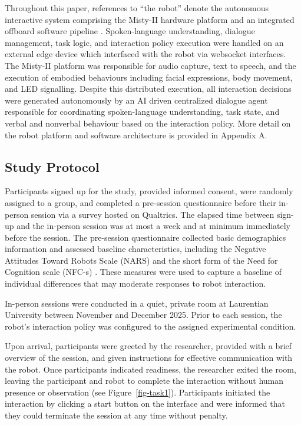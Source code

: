 \documentclass[
]{article}
\begin{document}
Throughout this paper, references to ``the robot'' denote the autonomous
interactive system comprising the Misty-II hardware platform and an
integrated offboard software pipeline \autocite{mistyrobotics}.
Spoken-language understanding, dialogue management, task logic, and
interaction policy execution were handled on an external edge device
which interfaced with the robot via websocket interfaces. The Misty-II
platform was responsible for audio capture, text to speech, and the
execution of embodied behaviours including facial expressions, body
movement, and LED signalling. Despite this distributed execution, all
interaction decisions were generated autonomously by an AI driven
centralized dialogue agent responsible for coordinating spoken-language
understanding, task state, and verbal and nonverbal behaviour based on
the interaction policy. More detail on the robot platform and software
architecture is provided in Appendix A.

\subsection{Study Protocol}\label{study-protocol}

Participants signed up for the study, provided informed consent, were
randomly assigned to a group, and completed a pre-session questionnaire
before their in-person session via a survey hosted on Qualtrics. The
elapsed time between sign-up and the in-person session was at most a
week and at minimum immediately before the session. The pre-session
questionnaire collected basic demographics information and assessed
baseline characteristics, including the Negative Attitudes Toward Robots
Scale (NARS) and the short form of the Need for Cognition scale (NFC-s)
\autocite{nomura,cacioppo1982}. These measures were used to capture a
baseline of individual differences that may moderate responses to robot
interaction.

In-person sessions were conducted in a quiet, private room at Laurentian
University between November and December 2025. Prior to each session,
the robot's interaction policy was configured to the assigned
experimental condition.

Upon arrival, participants were greeted by the researcher, provided with
a brief overview of the session, and given instructions for effective
communication with the robot. Once participants indicated readiness, the
researcher exited the room, leaving the participant and robot to
complete the interaction without human presence or observation (see
Figure~\ref{fig-task1}). Participants initiated the interaction by
clicking a start button on the interface and were informed that they
could terminate the session at any time without penalty.
\end{document}
